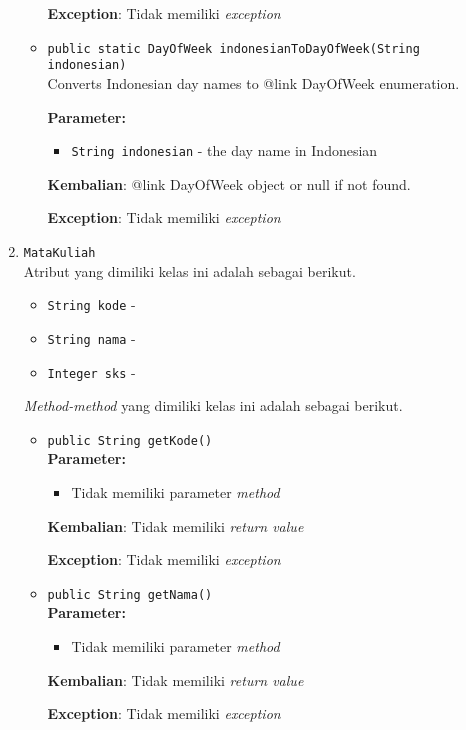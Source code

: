 \documentclass{article}
\begin{document}
\begin{enumerate}
\begin{itemize}
\textbf{Exception}: Tidak memiliki \textit{exception}

\item \texttt{public static DayOfWeek indonesianToDayOfWeek(String indonesian)}\\ 
Converts Indonesian day names to {@link DayOfWeek} enumeration.

\textbf{Parameter:}
\begin{itemize}
\item \texttt{String indonesian} - 
the day name in Indonesian
\end{itemize}
\textbf{Kembalian}: {@link DayOfWeek} object or null if not found.

\textbf{Exception}: Tidak memiliki \textit{exception}

\end{itemize}
\item \texttt{MataKuliah}\\ 
Atribut yang dimiliki kelas ini adalah sebagai berikut.
\begin{itemize}
\item \texttt{String kode} - 
\item \texttt{String nama} - 
\item \texttt{Integer sks} - 
\end{itemize}
\textit{Method-method} yang dimiliki kelas ini adalah sebagai berikut.
\begin{itemize}
\item \texttt{public String getKode()}\\ 


\textbf{Parameter:}\begin{itemize}
\item Tidak memiliki parameter \textit{method}
\end{itemize}
\textbf{Kembalian}: Tidak memiliki \textit{return value}

\textbf{Exception}: Tidak memiliki \textit{exception}

\item \texttt{public String getNama()}\\ 


\textbf{Parameter:}\begin{itemize}
\item Tidak memiliki parameter \textit{method}
\end{itemize}
\textbf{Kembalian}: Tidak memiliki \textit{return value}

\textbf{Exception}: Tidak memiliki \textit{exception}


\end{itemize}
\end{enumerate}
\end{document}
